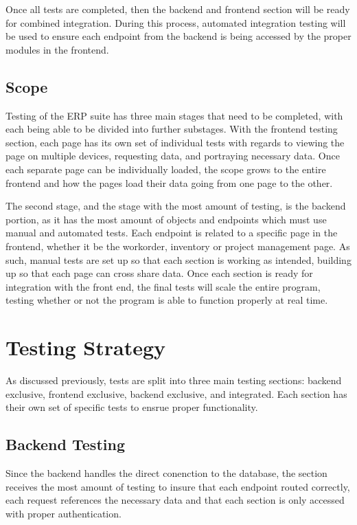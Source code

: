 {\setlength{\parindent}{0cm}

Once all tests are completed, then the backend and frontend section will be ready for combined integration. During this process, automated integration testing will be used to ensure each endpoint from the backend is being accessed by the proper modules in the frontend. 

\subsection{Scope}
Testing of the ERP suite has three main stages that need to be completed, with each being able to be divided into further substages. With the frontend testing section, each page has its own set of individual tests with regards to viewing the page on multiple devices, requesting data, and portraying necessary data. Once each separate page can be individually loaded, the scope grows to the entire frontend and how the pages load their data going from one page to the other. 
\newline
{\setlength{\parindent}{0cm}

The second stage, and the stage with the most amount of testing, is the backend portion, as it has the most amount of objects and endpoints which must use manual and automated tests. Each endpoint is related to a specific page in the frontend, whether it be the workorder, inventory or project management page. As such, manual tests are set up so that each section is working as intended, building up so that each page can cross share data. Once each section is ready for integration with the front end, the final tests will scale the entire program, testing whether or not the program is able to function properly at real time.
\newpage 

\section{Testing Strategy}
As discussed previously, tests are split into three main testing sections: backend exclusive, frontend exclusive, backend exclusive, and integrated. Each section has their own set of specific tests to ensrue proper functionality. 

\subsection{Backend Testing}
Since the backend handles the direct conenction to the database, the section receives the most amount of testing to insure that each endpoint routed correctly, each request references the necessary data and that each section is only accessed with proper authentication. 

}}
